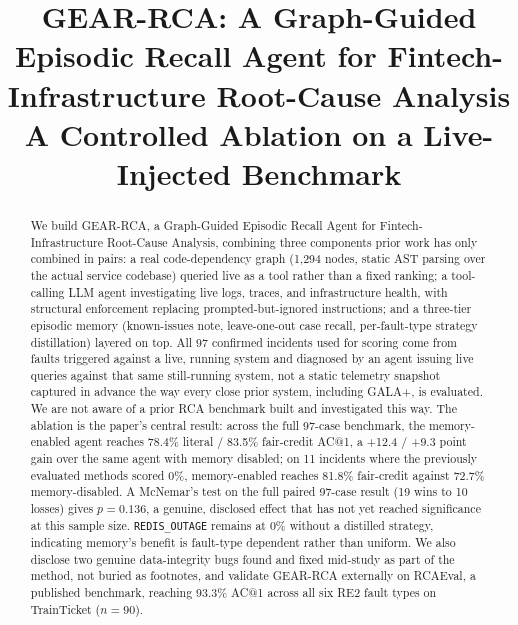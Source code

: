\documentclass[conference]{IEEEtran}
\begin{document}
\title{GEAR-RCA: A Graph-Guided Episodic Recall Agent for Fintech-Infrastructure Root-Cause Analysis\\
A Controlled Ablation on a Live-Injected Benchmark}

\author{
}

\maketitle

\begin{abstract}
We build GEAR-RCA, a Graph-Guided Episodic Recall Agent for Fintech-Infrastructure Root-Cause Analysis,
combining three components prior work has only combined in pairs: a real code-dependency graph (1{,}294 nodes,
static AST parsing over the actual service codebase) queried live as a tool rather than a fixed ranking; a
tool-calling LLM agent investigating live logs, traces, and infrastructure health, with structural enforcement
replacing prompted-but-ignored instructions; and a three-tier episodic memory (known-issues note, leave-one-out
case recall, per-fault-type strategy distillation) layered on top. All 97 confirmed incidents used for scoring
come from faults triggered against a live, running system and diagnosed by an agent issuing live queries against
that same still-running system, not a static telemetry snapshot captured in advance the way every close prior
system, including GALA+, is evaluated. We are not aware of a prior RCA benchmark built and investigated this
way. The ablation is the paper's central result: across the full 97-case benchmark, the memory-enabled agent
reaches 78.4\% literal / 83.5\% fair-credit AC@1, a +12.4 / +9.3 point gain over the same agent with memory
disabled; on 11 incidents where the previously evaluated methods scored 0\%, memory-enabled reaches 81.8\%
fair-credit against 72.7\% memory-disabled. A McNemar's test on the full paired 97-case result (19 wins to 10
losses) gives $p=0.136$, a genuine, disclosed effect that has not yet reached significance at this sample size.
\texttt{REDIS\_OUTAGE} remains at 0\% without a distilled strategy, indicating memory's benefit is fault-type
dependent rather than uniform. We also disclose two genuine data-integrity bugs found and fixed mid-study as part
of the method, not buried as footnotes, and validate GEAR-RCA externally on RCAEval, a published benchmark,
reaching 93.3\% AC@1 across all six RE2 fault types on TrainTicket ($n=90$).
\end{abstract}
\end{document}
